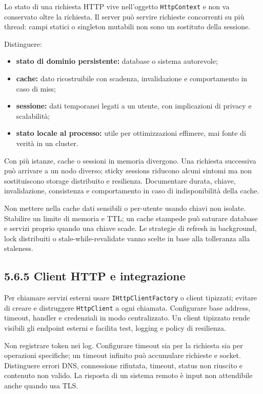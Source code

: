 \documentclass[
  italian,
  10pt,
]{book}
\providecommand{\tightlist}{%
  \setlength{\itemsep}{0pt}\setlength{\parskip}{0pt}}
\begin{document}
Lo stato di una richiesta HTTP vive nell'oggetto \texttt{HttpContext} e
non va conservato oltre la richiesta. Il server può servire richieste
concorrenti su più thread: campi statici o singleton mutabili non sono
un sostituto della sessione.

Distinguere:

\begin{itemize}
\tightlist
\item
  \textbf{stato di dominio persistente:} database o sistema autorevole;
\item
  \textbf{cache:} dato ricostruibile con scadenza, invalidazione e
  comportamento in caso di miss;
\item
  \textbf{sessione:} dati temporanei legati a un utente, con
  implicazioni di privacy e scalabilità;
\item
  \textbf{stato locale al processo:} utile per ottimizzazioni effimere,
  mai fonte di verità in un cluster.
\end{itemize}

Con più istanze, cache o sessioni in memoria divergono. Una richiesta
successiva può arrivare a un nodo diverso; sticky sessions riducono
alcuni sintomi ma non sostituiscono storage distribuito e resilienza.
Documentare durata, chiave, invalidazione, consistenza e comportamento
in caso di indisponibilità della cache.

Non mettere nella cache dati sensibili o per-utente usando chiavi non
isolate. Stabilire un limite di memoria e TTL; un cache stampede può
saturare database e servizi proprio quando una chiave scade. Le
strategie di refresh in background, lock distribuiti o
stale-while-revalidate vanno scelte in base alla tolleranza alla
staleness.

\subsection{5.6.5 Client HTTP e
integrazione}\label{client-http-e-integrazione}

Per chiamare servizi esterni usare \texttt{IHttpClientFactory} o client
tipizzati; evitare di creare e distruggere \texttt{HttpClient} a ogni
chiamata. Configurare base address, timeout, handler e credenziali in
modo centralizzato. Un client tipizzato rende visibili gli endpoint
esterni e facilita test, logging e policy di resilienza.

Non registrare token nei log. Configurare timeout sia per la richiesta
sia per operazioni specifiche; un timeout infinito può accumulare
richieste e socket. Distinguere errori DNS, connessione rifiutata,
timeout, status non riuscito e contenuto non valido. La risposta di un
sistema remoto è input non attendibile anche quando usa TLS.
\end{document}
